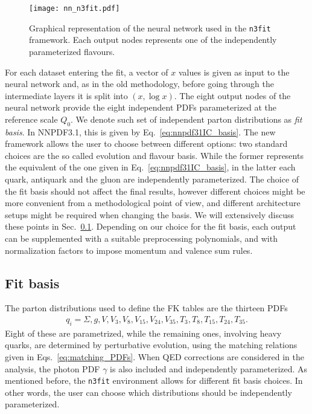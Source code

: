 \begin{figure}[htb]     
	\begin{center}
		\texttt{[image: nn\_n3fit.pdf]}
	\end{center}
    \caption{Graphical representation of the neural network used in the {\tt n3fit} framework.
    Each output nodes represents one of the independently parameterized flavours.}
	\label{fig:nn_n3fit}                 
\end{figure}

%
For each dataset entering the fit, a vector of $x$ values is given as input to the neural network and,
as in the old methodology, before going through the intermediate layers it is split into $\left(x,\log x\right)$.
The eight output nodes of the neural network provide the eight independent PDFs parameterized at 
the reference scale $Q_0$. We denote such set of independent parton distributions as \textit{fit basis}.
In NNPDF3.1, this is given by Eq.~\eqref{eq:nnpdf31IC_basis}. The new framework allows the user to choose between 
different options: two standard choices are the so called evolution and flavour basis.
While the former represents the equivalent of the one given in Eq.~\eqref{eq:nnpdf31IC_basis}, in
the latter each quark, antiquark and the gluon are independently parameterized. 
The choice of the fit basis should not affect the final results, however different choices might be more
convenient from a methodological point of view, and different architecture setups might be required
when changing the basis. We will extensively discuss these points in Sec.~\ref{sec:fitbasis}.
Depending on our choice for the fit basis, each output can be supplemented with a suitable preprocessing
polynomials, and with normalization factors to impose momentum and valence sum rules.

%

\subsection{Fit basis}
\label{sec:fitbasis}
The parton distributions used to define the FK tables are the thirteen PDFs
\begin{align}
	\label{eq::fkdistributions}
	q_i = \Sigma, g, V, V_3, V_8, V_{15}, V_{24}, V_{35}, T_3, T_8, T_{15}, T_{24}, T_{35}.
\end{align}
Eight of these are parametrized, while the remaining ones, involving heavy quarks,
are determined by perturbative evolution, using the matching relations given in Eqs.~\eqref{eq:matching_PDFs}.
When QED corrections are considered in the analysis,
the photon PDF $\gamma$ is also included and independently parameterized.   
As mentioned before, the {\tt n3fit} environment allows for different fit basis choices. In other 
words, the user can choose which distributions should be independently parameterized. 

